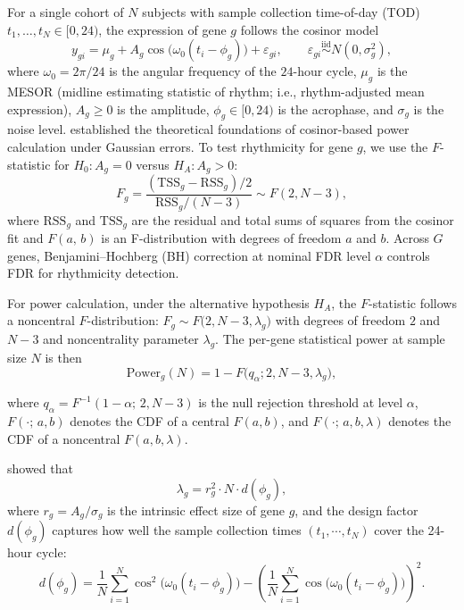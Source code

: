 \documentclass{article}
\begin{document}
For a single cohort of $N$ subjects with sample collection time-of-day (TOD)
$t_1,\ldots,t_N\in[0,24)$, the expression of gene $g$ follows the cosinor
model \citep{cornelissen2014cosinor}
\begin{equation}
y_{gi}
=
\mu_g
+
A_g\cos \bigl(\omega_0 (t_i - \phi_g)\bigr)
+
\varepsilon_{gi},
\qquad
\varepsilon_{gi}\overset{\text{iid}}{\sim}N(0,\sigma_g^2),
\label{eq:cosinor_model}
\end{equation}
where $\omega_0 = 2\pi/24$ is the angular frequency of the $24$-hour cycle, $\mu_g$ is the MESOR (midline estimating statistic of rhythm; i.e., rhythm-adjusted mean expression), $A_g\geq 0$ is the amplitude,
$\phi_g\in[0,24)$ is the acrophase, and $\sigma_g$ is the noise level. \citet{zong2023circapower} established the theoretical foundations of cosinor-based power calculation under Gaussian errors. To test rhythmicity for gene $g$, we use the $F$-statistic for $H_0: A_g = 0$ versus $H_A: A_g > 0$:
\begin{equation}
F_g
=
\frac{(\mathrm{TSS}_g - \mathrm{RSS}_g)/2}{\mathrm{RSS}_g/(N-3)}
\sim F(2, N-3),
\label{eq:rhythm_f_test}
\end{equation}
where $\mathrm{RSS}_g$ and $\mathrm{TSS}_g$ are the residual and total sums of
squares from the cosinor fit and $F(a,\, b)$ is an F-distribution with degrees of freedom $a$ and $b$. Across $G$ genes, Benjamini--Hochberg (BH)
correction \citep{benjamini1995controlling} at nominal FDR level $\alpha$
controls FDR for rhythmicity detection.

For power calculation, under the alternative hypothesis $H_A$, the $F$-statistic follows a noncentral $F$-distribution:
$F_g\sim  F\bigl( 2, N-3, \lambda_g\bigr)$ with degrees of freedom $2$ and $N-3$ and noncentrality parameter $\lambda_g$. The per-gene statistical power at sample size $N$ is then
\begin{equation}
\mathrm{Power}_g(N)
=
1 - F\bigl(q_{\alpha}; 2, N-3, \lambda_g\bigr),
\label{eq:circapower_formula}
\end{equation}

\noindent where $q_{\alpha} = F^{-1}(1 - \alpha;\, 2, N - 3)$ is the null rejection threshold at level $\alpha$, $F(\cdot;\, a, b)$ denotes the CDF of a central $F(a, b)$, and $F(\cdot;\, a, b, \lambda)$ denotes the CDF of a noncentral $F(a, b, \lambda)$.

\citet{zong2023circapower} showed that
\begin{equation}
\lambda_g = r_g^2 \cdot N \cdot d(\phi_g),
\label{eq:ncp}
\end{equation}
where $r_g = A_g/\sigma_g$ is the intrinsic effect size of gene $g$, and the design factor $d(\phi_g)$ captures how well the sample collection times $(t_1,\cdots,t_N)$ cover the 24-hour cycle:
\begin{equation}
d(\phi_g)
=
\frac{1}{N}\sum_{i=1}^N \cos^2\bigl(\omega_0 (t_i - \phi_g)\bigr)
-
\left(\frac{1}{N}\sum_{i=1}^N \cos\bigl(\omega_0 (t_i - \phi_g)\bigr)\right)^{\!2}.
\label{eq:design_factor_circapower}
\end{equation}
\end{document}
